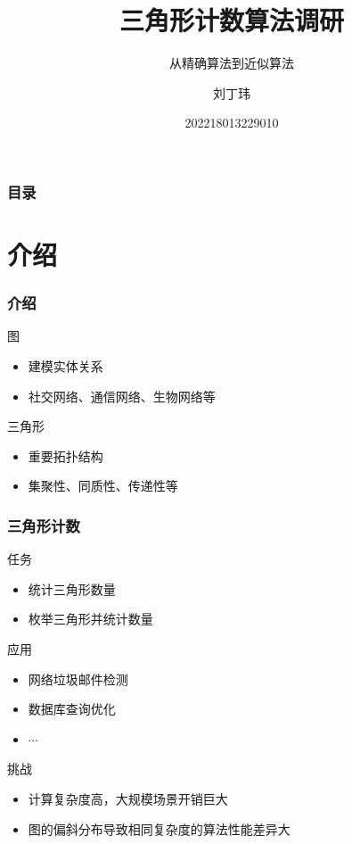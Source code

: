 \documentclass{beamer}
\title[三角形计数] %
{三角形计数算法调研}
\subtitle{从精确算法到近似算法}
\author[刘丁玮] %
{刘丁玮}
\date[2022-06-30] %
{202218013229010}
\begin{document}
\frame{\titlepage}

\begin{frame}
\frametitle{目录}
\tableofcontents
\end{frame}
\section{介绍} 
\begin{frame}
\frametitle{介绍} 
图
\begin{itemize}
    \item 建模实体关系
    \item 社交网络、通信网络、生物网络等
\end{itemize}

三角形
\begin{itemize}
    \item 重要拓扑结构 
    \item 集聚性、同质性、传递性等
\end{itemize}
\end{frame}

\begin{frame}
\frametitle{三角形计数} 
任务
\begin{itemize}
    \item 统计三角形数量
    \item 枚举三角形并统计数量
\end{itemize}
应用
\begin{itemize}
    \item 网络垃圾邮件检测\cite{becchetti2008efficient}
    \item 数据库查询优化\cite{bar2002reductions}
    \item $\cdots$
\end{itemize}
挑战
\begin{itemize}
    \item 计算复杂度高，大规模场景开销巨大
    \item 图的偏斜分布\cite{barabasi1999emergence}导致相同复杂度的算法性能差异大
\end{itemize}
\end{frame}
\end{document}
